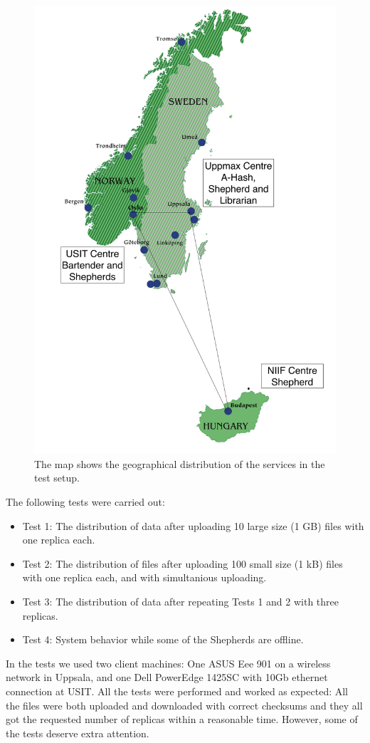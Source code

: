 \documentclass[final]{ieee}
\begin{document}
\begin{figure}
\centering
\includegraphics[width=0.7\columnwidth]{map}
\caption{The map shows the geographical distribution of the services in the test setup.}
\label{fig:map}
\end{figure}  

The following tests were carried out:

\begin{itemize}
\item Test 1: The distribution of data after uploading 10 large size (1 GB)
  files with one replica each.  
\item Test 2: The distribution of files after uploading 100 small size (1 kB)
  files with one replica each, and with simultanious uploading.
\item Test 3: The distribution of data after repeating Tests 1 and 2 with three replicas.  
\item Test 4: System behavior while some of the Shepherds are offline.   
\end{itemize}

In the tests we used two client machines: One ASUS Eee 901 on a wireless network in Uppsala, 
and one Dell PowerEdge 1425SC with 10Gb ethernet connection at USIT. All the tests were performed and worked as expected: All the files were both 
uploaded and downloaded with correct checksums and they all got the requested 
number of replicas within a reasonable time. However, some of
the tests deserve extra attention.
\end{document}
